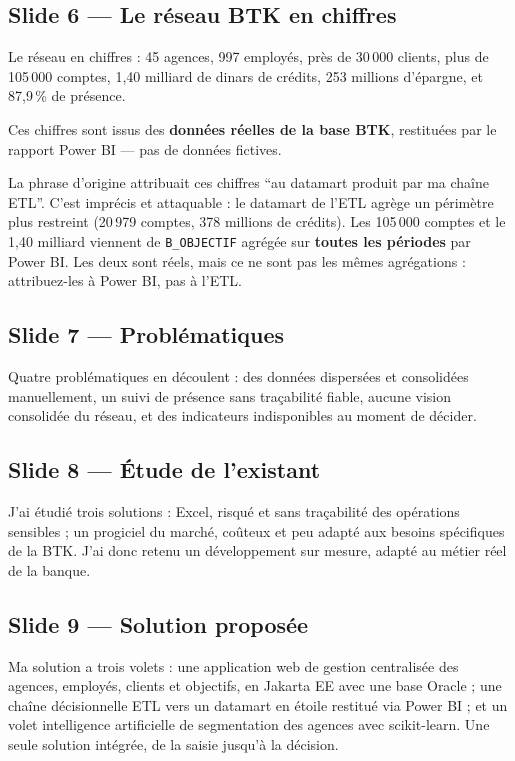 \documentclass[a4paper,11pt]{article}
\begin{document}
\subsection*{Slide 6 --- Le réseau BTK en chiffres}

Le réseau en chiffres : 45 agences, 997 employés, près de 30\,000 clients,
plus de 105\,000 comptes, 1,40 milliard de dinars de crédits, 253 millions
d'épargne, et 87,9\,\% de présence.

Ces chiffres sont issus des \textbf{données réelles de la base BTK}, restituées
par le rapport Power BI --- pas de données fictives.

\begin{corrige}
La phrase d'origine attribuait ces chiffres \enquote{au datamart produit par ma
chaîne ETL}. C'est imprécis et attaquable : le datamart de l'ETL agrège un
périmètre plus restreint (20\,979 comptes, 378 millions de crédits). Les
105\,000 comptes et le 1,40 milliard viennent de \texttt{B\_OBJECTIF} agrégée
sur \textbf{toutes les périodes} par Power BI. Les deux sont réels, mais ce ne
sont pas les mêmes agrégations : attribuez-les à Power BI, pas à l'ETL.
\end{corrige}

\subsection*{Slide 7 --- Problématiques}

Quatre problématiques en découlent : des données dispersées et consolidées
manuellement, un suivi de présence sans traçabilité fiable, aucune vision
consolidée du réseau, et des indicateurs indisponibles au moment de décider.

\subsection*{Slide 8 --- Étude de l'existant}

J'ai étudié trois solutions : Excel, risqué et sans traçabilité des opérations
sensibles ; un progiciel du marché, coûteux et peu adapté aux besoins
spécifiques de la BTK. J'ai donc retenu un développement sur mesure, adapté au
métier réel de la banque.

\subsection*{Slide 9 --- Solution proposée}

Ma solution a trois volets : une application web de gestion centralisée des
agences, employés, clients et objectifs, en Jakarta EE avec une base Oracle ;
une chaîne décisionnelle ETL vers un datamart en étoile restitué via Power BI ;
et un volet intelligence artificielle de segmentation des agences avec
scikit-learn. Une seule solution intégrée, de la saisie jusqu'à la décision.
\end{document}
